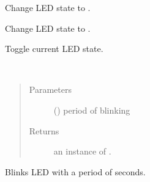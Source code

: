 \documentclass[letterpaper,10pt,english]{sphinxmanual}
\begin{document}
\begin{fulllineitems}
\begin{fulllineitems}
\begin{quote}
\begin{description}
\end{description}\end{quote}

\end{fulllineitems}


\begin{fulllineitems}
\label{\detokenize{index:rcpy.led.LED.on}}
Change LED state to .

\end{fulllineitems}


\begin{fulllineitems}
\label{\detokenize{index:rcpy.led.LED.off}}
Change LED state to .

\end{fulllineitems}


\begin{fulllineitems}
\label{\detokenize{index:rcpy.led.LED.toggle}}
Toggle current LED state.

\end{fulllineitems}


\begin{fulllineitems}
\label{\detokenize{index:rcpy.led.LED.blink}}~\begin{quote}\begin{description}
\item[{Parameters}] \leavevmode
{} () \textendash{} period of blinking

\item[{Returns}] \leavevmode
an instance of {\hyperref[\detokenize{index:rcpy.led.Blink}]{}}.

\end{description}\end{quote}

Blinks LED with a period of  seconds.

\end{fulllineitems}


\end{fulllineitems}
\end{document}
